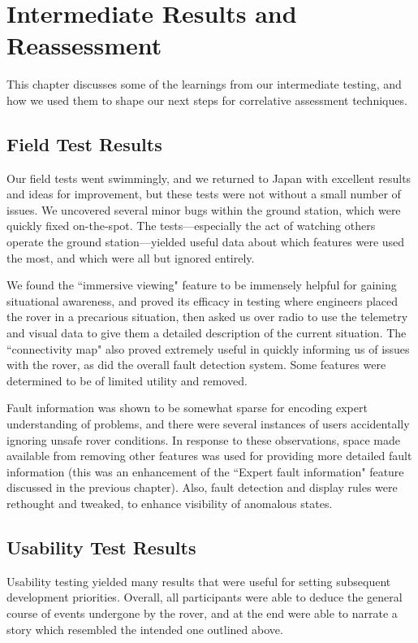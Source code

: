 \chapter{Intermediate Results and Reassessment}

This chapter discusses some of the learnings from our intermediate testing, and how we used them to shape our next steps for correlative assessment techniques.

\section{Field Test Results}

Our field tests went swimmingly, and we returned to Japan with excellent results and ideas for improvement, but these tests were not without a small number of issues. We uncovered several minor bugs within the ground station, which were quickly fixed on-the-spot. The tests---especially the act of watching others operate the ground station---yielded useful data about which features were used the most, and which were all but ignored entirely.

We found the ``immersive viewing" feature to be immensely helpful for gaining situational awareness, and proved its efficacy in testing where engineers placed the rover in a precarious situation, then asked us over radio to use the telemetry and visual data to give them a detailed description of the current situation. The ``connectivity map" also proved extremely useful in quickly informing us of issues with the rover, as did the overall fault detection system. Some features were determined to be of limited utility and removed.

Fault information was shown to be somewhat sparse for encoding expert understanding of problems, and there were several instances of users accidentally ignoring unsafe rover conditions. In response to these observations, space made available from removing other features was used for providing more detailed fault information (this was an enhancement of the ``Expert fault information" feature discussed in the previous chapter). Also, fault detection and display rules were rethought and tweaked, to enhance visibility of anomalous states.

\section{Usability Test Results}

Usability testing yielded many results that were useful for setting subsequent development priorities. Overall, all participants were able to deduce the general course of events undergone by the rover, and at the end were able to narrate a story which resembled the intended one outlined above.

